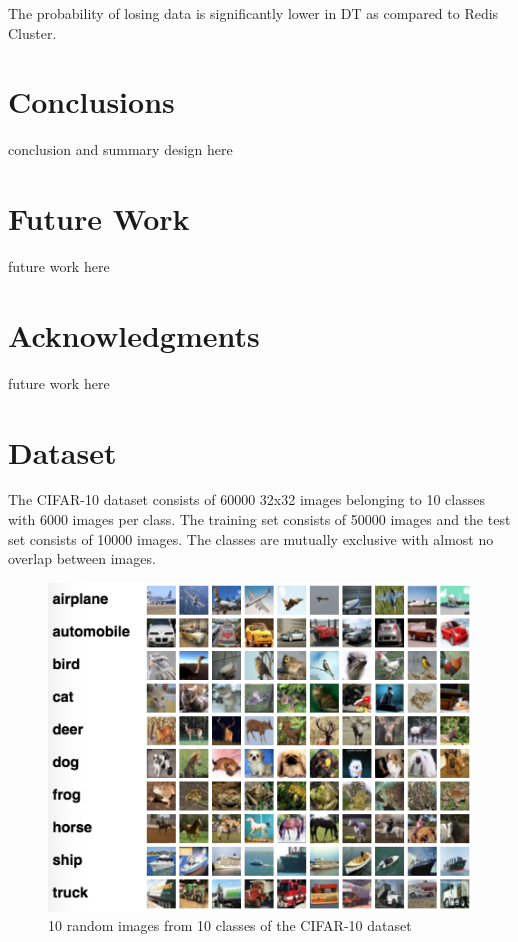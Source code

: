\documentclass[10pt,twocolumn,letterpaper]{article}
\begin{document}
The probability of losing data is significantly lower in DT as compared to Redis Cluster.



\section{Conclusions} \label{conclusions}
conclusion and summary design here

\section{Future Work} \label{futurework}
future work here

\section{Acknowledgments} \label{acknowledgments}
future work here

\section{Dataset}
The CIFAR-10 dataset \cite{krizhevsky2009learning} consists of 60000 32x32 images belonging to 10 classes with 6000 images per class.	The training set consists of 50000 images and the test set consists of 10000 images. The classes are mutually exclusive with almost no overlap between images.

\begin{figure}[hbt]
  \includegraphics[scale=0.50]{cifar-dataset}
  \caption{10 random images from 10 classes of the CIFAR-10 dataset}
\end{figure}
\end{document}
